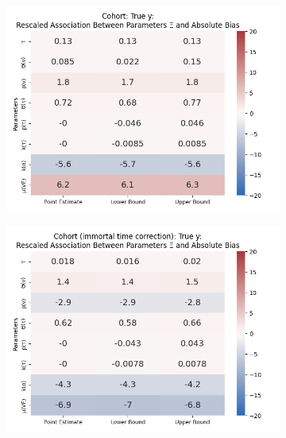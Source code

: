 \documentclass[12pt]{article}
\begin{document}
\begin{figure}[H]
	\centering
	\caption{Rescaled Association Between Parameters $\Xi$ and Absolute Bias By Study Design ($p_v=0.5$; $\Theta_{\tau}=0.75$; $p_\tau=0.75$; $k_\tau=0.95$; $k_\alpha=0.75$)}
	\begin{subfigure}[t]{0.23\linewidth}
		\centering
		\caption{}
		\includegraphics[scale=0.25]{VEMethod_Drivers1b_FEest_Realistic2_Li_MSpec_Heatmap1.png}
	\end{subfigure}
	\begin{subfigure}[t]{0.23\linewidth}
		\centering
		\caption{}
		\includegraphics[scale=0.25]{VEMethod_Drivers1b_FEest_Realistic2_Li_MSpec_Heatmap2.png}
	\end{subfigure}

\end{figure}
\end{document}
